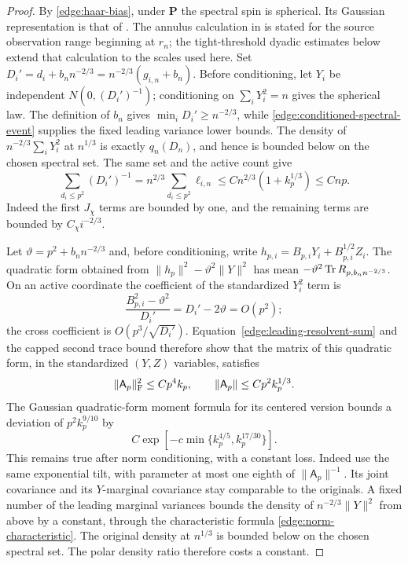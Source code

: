 \begin{proof}
By \eqref{edge:haar-bias}, under \(\mathbf P\) the spectral spin is
spherical.  Its Gaussian representation is that of
\cite[Proposition~2.3]{FUA}.  The annulus calculation in
\cite[Lemma~3.1, Equation~(3.1)]{FUA} is stated for the source observation
range beginning at \(r_n\); the tight-threshold dyadic estimates below
extend that calculation to the scales used here.
Set \(D_i'=d_i+b_nn^{-2/3}=n^{-2/3}(g_{i,n}+b_n)\).
Before conditioning, let \(Y_i\) be independent \(N(0,(D_i')^{-1})\);
conditioning on \(\sum_iY_i^2=n\) gives the spherical law.
The definition of \(b_n\) gives \(\min_iD_i'\ge n^{-2/3}\), while
\eqref{edge:conditioned-spectral-event} supplies the fixed leading
variance lower bounds.  The density of
\(n^{-2/3}\sum_iY_i^2\) at \(n^{1/3}\) is exactly \(q_n(D_n)\),
and hence is bounded below on the chosen spectral set.  The same set
and the active count give
\begin{equation}\label{edge:leading-resolvent-sum}
 \sum_{d_i\le p^2}(D_i')^{-1}
   =n^{2/3}\sum_{d_i\le p^2}\ell_{i,n}
   \le Cn^{2/3}(1+k_p^{1/3})\le Cnp.
\end{equation}
Indeed the first \(J_\chi\) terms are bounded by one, and the remaining
terms are bounded by \(C_\chi i^{-2/3}\).

Let \(\vartheta=p^2+b_nn^{-2/3}\) and, before conditioning, write
\(h_{p,i}=B_{p,i}Y_i+B_{p,i}^{1/2}Z_i\).
The quadratic form obtained from
\(\|h_p\|^2-\vartheta^2\|Y\|^2\) has mean
\(-\vartheta^2\operatorname{Tr} R_{p,b_nn^{-2/3}}\).  On an active coordinate the
coefficient of the standardized \(Y_i^2\) term is
\[
 \frac{B_{p,i}^2-\vartheta^2}{D_i'}=D_i'-2\vartheta=O(p^2);
\]
the cross coefficient is \(O(p^3/\sqrt{D_i'})\).
Equation~\eqref{edge:leading-resolvent-sum} and the capped second trace
bound therefore show that the matrix of this quadratic form, in the
standardized \((Y,Z)\) variables, satisfies
\[
 \|\mathsf A_p\|_{\rm F}^2\le Cp^4k_p,\qquad
 \|\mathsf A_p\|\le Cp^2k_p^{1/3}.
\]
The Gaussian quadratic-form moment formula for its centered version bounds a deviation of
\(p^2k_p^{9/10}\) by
\[
 C\exp\left[-c\min\{k_p^{4/5},k_p^{17/30}\}\right].
\]
This remains true after norm conditioning, with a constant loss.
Indeed use the same exponential tilt, with parameter at most one
eighth of \(\|\mathsf A_p\|^{-1}\).  Its joint covariance and its
\(Y\)-marginal covariance stay comparable to the originals.  A fixed
number of the leading marginal variances bounds the density of
\(n^{-2/3}\|Y\|^2\) from above by a constant, through the characteristic
formula \eqref{edge:norm-characteristic}.  The original density at
\(n^{1/3}\) is bounded below on the chosen spectral set.  The polar
density ratio therefore costs a constant.


\end{proof}

